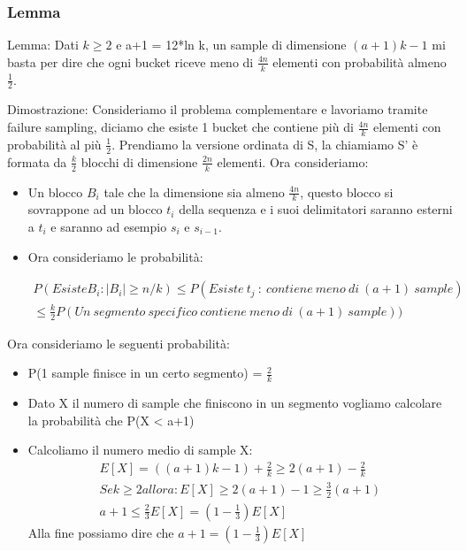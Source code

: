 \documentclass[14pt]{extreport}
\begin{document}
\subsubsection{Lemma}

Lemma: Dati $k \geq 2$ e a+1 = 12*ln k, un sample di dimensione $(a+1)k-1$ mi basta per dire che ogni bucket riceve meno di $\frac{4n}{k}$ elementi con probabilità almeno $\frac{1}{2}$.

Dimostrazione: Consideriamo il problema complementare e lavoriamo tramite failure sampling, diciamo che esiste 1 bucket che contiene più di $\frac{4n}{k}$ elementi con probabilità al più $\frac{1}{2}$.
Prendiamo la versione ordinata di S, la chiamiamo S' è formata da $\frac{k}{2}$ blocchi di dimensione $\frac{2n}{k}$ elementi.
Ora consideriamo:
\begin{itemize}
    \item Un blocco $B_i$ tale che la dimensione sia almeno $\frac{4n}{k}$, questo blocco si sovrappone ad un blocco $t_i$ della sequenza e i suoi delimitatori saranno esterni a $t_i$ e saranno ad esempio $s_i$ e $s_{i-1}$.
    \item Ora consideriamo le probabilità:
        
        \begin{equation*}
        \label{eq:pareto mle2}
            \begin{multlined}
            P(Esiste B_i : |B_i| \geq n/k) \leq P(Esiste\ t_j\ :\ contiene\ meno\ di\ (a+1)\ sample) \\
            \leq \frac{k}{2} P(Un\ segmento\ specifico\ contiene\ meno\ di\ (a+1)\ sample))
            \end{multlined}
            \end{equation*}
   
\end{itemize}
Ora consideriamo le seguenti probabilità:
\begin{itemize}
    \item P(1 sample finisce in un certo segmento) = $\frac{2}{k}$
    \item Dato X il numero di sample che finiscono in un segmento vogliamo calcolare la probabilità che P(X < a+1)
    \item Calcoliamo il numero medio di sample X: 
           \begin{equation*}
        \label{eq:pareto mle2}
            \begin{multlined}
            E[X] = ((a+1)k-1)+\frac{2}{k} \geq 2(a+1) - \frac{2}{k} \\
            Se k \geq 2 allora:
            E[X] \geq 2(a+1) - 1 \geq \frac{3}{2}(a+1) \\
            a+1 \leq \frac{2}{3}E[X] = (1- \frac{1}{3})E[X]
            \end{multlined}
            \end{equation*}
            Alla fine possiamo dire che $a+1 = (1- \frac{1}{3})E[X]$
\end{itemize}
\end{document}

